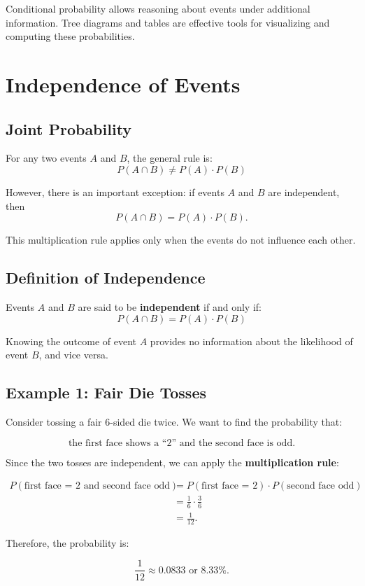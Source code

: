 \begin{remark}
Conditional probability allows reasoning about events under additional information. Tree diagrams and tables are effective tools for visualizing and computing these probabilities.
\end{remark}
\section{Independence of Events}

\subsection{Joint Probability}
For any two events $A$ and $B$, the general rule is:
\[
P(A \cap B) \neq P(A) \cdot P(B)
\]

However, there is an important exception: if events $A$ and $B$ are independent, then
\[
P(A \cap B) = P(A) \cdot P(B).
\]

\begin{explanation}
This multiplication rule applies only when the events do not influence each other.
\end{explanation}

\subsection{Definition of Independence}
\begin{definition}[Independence]
Events $A$ and $B$ are said to be \textbf{independent} if and only if:
\[
P(A \cap B) = P(A) \cdot P(B)
\]
\end{definition}

\begin{explanation}
Knowing the outcome of event $A$ provides no information about the likelihood of event $B$, and vice versa.
\end{explanation}

\subsection{Example 1: Fair Die Tosses}

\begin{eg}
Consider tossing a fair 6-sided die twice. We want to find the probability that:

\[
\text{the first face shows a ``2'' and the second face is odd.}
\]

Since the two tosses are independent, we can apply the \textbf{multiplication rule}:

\[
\begin{aligned}
P(\text{first face = 2 and second face odd}) 
&= P(\text{first face = 2}) \cdot P(\text{second face odd}) \\
&= \frac{1}{6} \cdot \frac{3}{6} \\
&= \frac{1}{12}.
\end{aligned}
\]

Therefore, the probability is:

\[
\frac{1}{12} \approx 0.0833 \text{ or } 8.33\%.
\]
\end{eg}

